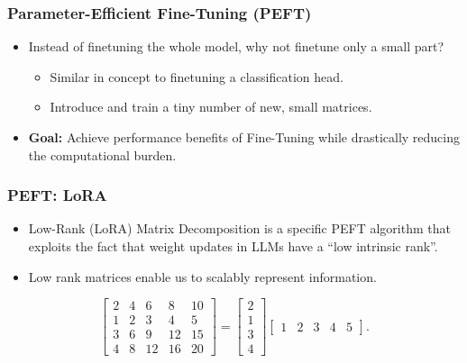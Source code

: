 \documentclass[24pt]{beamer}
\begin{document}
    \begin{frame}
    	\frametitle{Parameter-Efficient Fine-Tuning (PEFT)}
    	
    	\begin{itemize}
    		\item Instead of finetuning the whole model, why not finetune \alert{only a small part}?
    		 \begin{itemize}
    		 	\item Similar in concept to finetuning a classification head.
    		 	\item Introduce and train a	tiny number of new, small matrices.
    		 \end{itemize}
    		 \item \textbf{Goal:} Achieve performance benefits
    		 of Fine-Tuning while \alert{drastically reducing the computational burden}.
    	\end{itemize}
    \end{frame}
    
    \begin{frame}
    	\frametitle{PEFT: LoRA}
    	
    	\begin{itemize}
    		\item Low-Rank (LoRA) Matrix Decomposition is a specific PEFT algorithm that exploits the fact that weight updates in LLMs have a \alert{``low intrinsic rank''}.
    		
    		\item Low rank matrices enable us to \alert{scalably} represent information.
    	\end{itemize}
    	
    	\[
    	\begin{bmatrix}
    		2 & 4 & 6 & 8 & 10\\
    		1 & 2 & 3 & 4 & 5\\
    		3 & 6 & 9 & 12 & 15\\
    		4 & 8 & 12 & 16 & 20
    	\end{bmatrix}
    	=
    	\begin{bmatrix}
    		2\\
    		1\\	
    		3\\
    		4
    	\end{bmatrix}
    	\begin{bmatrix}
    		1 & 2 & 3 & 4 & 5
    	\end{bmatrix}.
    	\]

    \end{frame}
    
\end{document}
